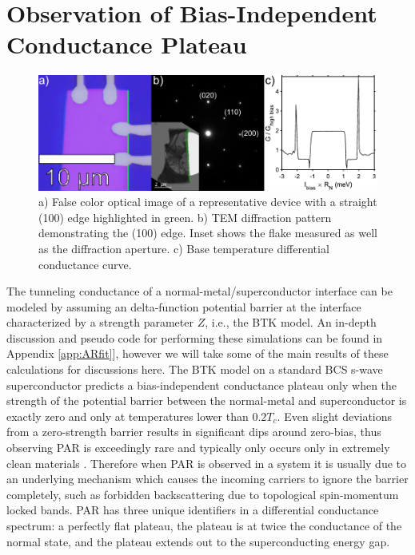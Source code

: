\section{Observation of Bias-Independent Conductance Plateau}
\begin{figure}
	\centering
	\includegraphics[width = \textwidth]{Chap4/Figures/DeviceFab.pdf}
	\caption{a) False color optical image of a representative device with a straight (100) edge highlighted in green. b) \ac{TEM} diffraction pattern demonstrating the (100) edge. Inset shows the flake measured as well as the diffraction aperture. c) Base temperature differential conductance curve.}
	\label{fig:PARDeviceFab}
\end{figure}
The tunneling conductance of a normal-metal/superconductor interface can be modeled by assuming an delta-function potential barrier at the interface characterized by a strength parameter $Z$, i.e., the \ac{BTK} model. An in-depth discussion and pseudo code for performing these simulations can be found in Appendix \ref{app:ARfit}], however we will take some of the main results of these calculations for discussions here. The \ac{BTK} model on a standard \ac{BCS} s-wave superconductor predicts a bias-independent conductance plateau only when the strength of the potential barrier between the normal-metal and superconductor is exactly zero and only at temperatures lower than $0.2T_{c}$. Even slight deviations from a zero-strength barrier results in significant dips around zero-bias, thus observing \ac{PAR} is exceedingly rare and typically only occurs only in extremely clean materials \cite{Lee2019, Soulen85}. Therefore when \ac{PAR} is observed in a system it is usually due to an underlying mechanism which causes the incoming carriers to ignore the barrier completely, such as forbidden backscattering due to topological spin-momentum locked bands\cite{Lee2019,Young2009}. \ac{PAR} has three unique identifiers in a differential conductance spectrum: a perfectly flat plateau, the plateau is at twice the conductance of the normal state, and the plateau extends out to the superconducting energy gap.\par
